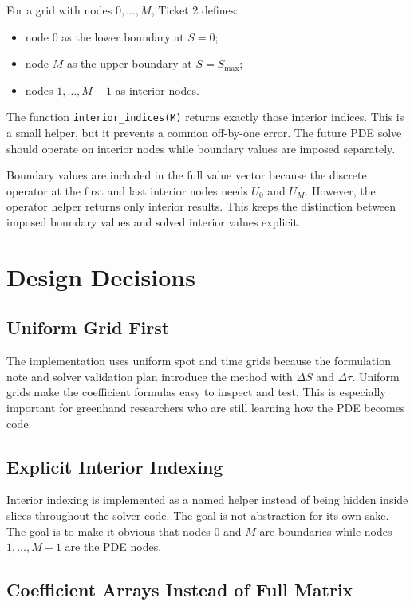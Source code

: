 \documentclass[11pt,a4paper]{article}
\newcommand{\code}[1]{\texttt{#1}}
\begin{document}
For a grid with nodes \(0,\ldots,M\), Ticket 2 defines:
\begin{itemize}
  \item node \(0\) as the lower boundary at \(S=0\);
  \item node \(M\) as the upper boundary at \(S=S_{\max}\);
  \item nodes \(1,\ldots,M-1\) as interior nodes.
\end{itemize}

The function \code{interior\_indices(M)} returns exactly those interior indices. This is a small
helper, but it prevents a common off-by-one error. The future PDE solve should operate on
interior nodes while boundary values are imposed separately.

Boundary values are included in the full value vector because the discrete operator at the first
and last interior nodes needs \(U_0\) and \(U_M\). However, the operator helper returns only
interior results. This keeps the distinction between imposed boundary values and solved interior
values explicit.

\section{Design Decisions}

\subsection{Uniform Grid First}

The implementation uses uniform spot and time grids because the formulation note and solver
validation plan introduce the method with \(\Delta S\) and \(\Delta \tau\). Uniform grids make
the coefficient formulas easy to inspect and test. This is especially important for greenhand
researchers who are still learning how the PDE becomes code.

\subsection{Explicit Interior Indexing}

Interior indexing is implemented as a named helper instead of being hidden inside slices
throughout the solver code. The goal is not abstraction for its own sake. The goal is to make it
obvious that nodes \(0\) and \(M\) are boundaries while nodes \(1,\ldots,M-1\) are the PDE
nodes.

\subsection{Coefficient Arrays Instead of Full Matrix}
\end{document}
